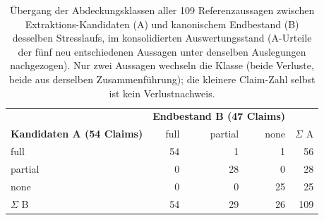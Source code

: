 
\begin{table}[htbp]
  \centering
  \small
  \begin{tabular}{lrrrr}
    \hline
    & \multicolumn{3}{c}{\textbf{Endbestand B (47 Claims)}} & \\
    \textbf{Kandidaten A (54 Claims)} & full & partial & none & $\Sigma$ A \\
    \hline
    full    & 54 & 1 & 1 & 56 \\
    partial & 0 & 28 & 0 & 28 \\
    none    & 0 & 0 & 25 & 25 \\
    \hline
    $\Sigma$ B & 54 & 29 & 26 & 109 \\
    \hline
  \end{tabular}
  \caption[Abdeckung vor und nach der Kanonisierung im Stresslauf]{Übergang der Abdeckungsklassen aller 109 Referenzaussagen
    zwischen Extraktions-Kandidaten (A) und kanonischem Endbestand
    (B) desselben Stresslaufs, im konsolidierten Auswertungsstand
    (A-Urteile der fünf neu entschiedenen Aussagen unter denselben
    Auslegungen nachgezogen). Nur zwei Aussagen wechseln die Klasse
    (beide Verluste, beide aus derselben Zusammenführung); die
    kleinere Claim-Zahl selbst ist kein Verlustnachweis.}
  \label{t:eval-stufen}
\end{table}
